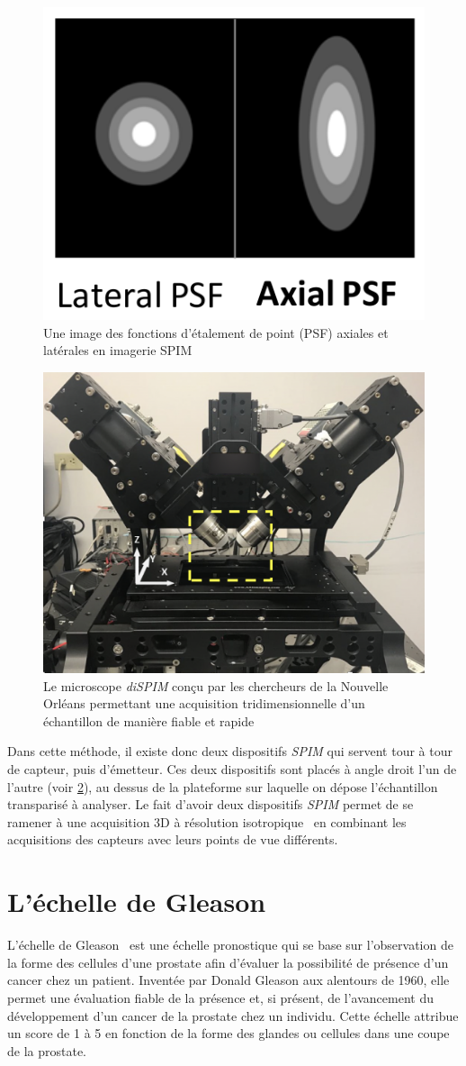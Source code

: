 {{		\begin{figure}[!htp]
			\centering
			\includegraphics[width=0.3\linewidth]{./img/spim_01_psf.png}
			\caption{Une image des fonctions d'étalement de point (PSF) axiales et latérales en imagerie SPIM}
			\label{img:spim_01_point_spread_function}
		\end{figure}

		\begin{figure}[H]
			\centering
			\includegraphics[width=0.5\linewidth]{./img/lsm_device_02.png}
			\caption{Le microscope \textit{diSPIM} conçu par les chercheurs de la Nouvelle Orléans permettant une acquisition tridimensionnelle d'un échantillon de manière fiable et rapide}
			\label{lsm_02_device}
		\end{figure}

		Dans cette méthode, il existe donc deux dispositifs \textit{SPIM} qui servent tour à tour de capteur, puis d'émetteur. Ces deux dispositifs sont placés à angle droit l'un de l'autre (voir \ref{lsm_02_device}), au dessus de la plateforme sur laquelle on dépose l'échantillon transparisé à analyser. Le fait d'avoir deux dispositifs \textit{SPIM} permet de se ramener à une acquisition 3D à résolution isotropique\footnotemark~ en combinant les acquisitions des capteurs avec leurs points de vue différents.\par
	}

	\section{L'\'echelle de Gleason}
	{
		L'échelle de Gleason~\cite{cite_gleason_score} est une échelle pronostique qui se base sur l'observation de la forme des cellules d'une prostate afin d'évaluer la possibilité de présence d'un cancer chez un patient. Inventée par Donald Gleason aux alentours de 1960, elle permet une évaluation fiable de la présence et, si présent, de l'avancement du développement d'un cancer de la prostate chez un individu. Cette échelle attribue un score de 1 à 5 en fonction de la forme des glandes ou cellules dans une coupe de la prostate.\par

}}
